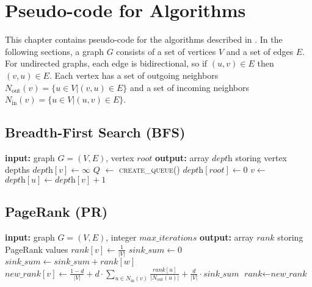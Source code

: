 \chapter{Pseudo-code for Algorithms}
\label{chap:algorithms}
This chapter contains pseudo-code for the algorithms described in . In the following sections, a graph $G$ consists of a set of vertices $V$ and a set of edges $E$. For undirected graphs, each edge is bidirectional, so if $(u, v) \in E$ then $(v, u) \in E$. Each vertex has a set of outgoing neighbors $N_\mathrm{out}(v) = \{u \in V | (v, u) \in E\}$ and a set of incoming neighbors $N_\mathrm{in}(v) = \{u \in V | (u, v) \in E\}$.

\section{Breadth-First Search (BFS)}

\begin{algorithm}[h!]
\begin{algorithmic}[1]
\Statex \textbf{input:} graph $G=(V,E)$, vertex $\textit{root}$
\Statex \textbf{output:} array $\textit{depth}$ storing vertex depths
  \State $\textit{depth}[v] \gets \infty$
\EndFor
\State $Q$ $\gets$  \textsc{create\_queue()}
\State {}
\State $\textit{depth}[\textit{root}] \gets 0$
  \State $v \gets $ 
      \State $\textit{depth}[u] \gets \textit{depth}[v] + 1$
      \State {}
    \EndIf
  \EndFor
\EndWhile
\end{algorithmic}
\end{algorithm}

\section{PageRank (PR)}

\begin{algorithm}[h!]
\begin{algorithmic}[1]
\Statex \textbf{input:} graph $G=(V,E)$, integer $\textit{max\_iterations}$
\Statex \textbf{output:} array $\textit{rank}$ storing PageRank values
  \State $\textit{rank}[v] \gets \frac{1}{|V|}$
\EndFor
{}
\State $\textit{sink\_sum} \gets 0$
    \State $\textit{sink\_sum} \gets \textit{sink\_sum} + \textit{rank}[w]$
  \EndIf
\EndFor
{}
  \State $\textit{new\_rank}[v] \gets \frac{1-d}{|V|} + d \cdot \sum_{u \in N_\mathrm{in}(v)} \frac{\textit{rank}[u]}{|N_\mathrm{out}(u)|} + \frac{d}{|V|} \cdot \textit{sink\_sum} $
\EndFor
\State $\textit{rank} \gets \textit{new\_rank}$
\EndFor
\end{algorithmic}
\end{algorithm}

